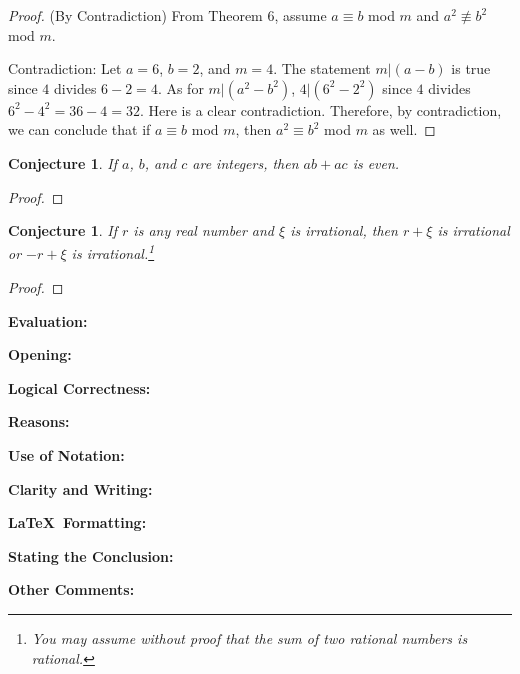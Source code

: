 \documentclass[11pt,titlepage]{article}		%
\def\rubric{\textbf{Evaluation:} \makebox[0.75in]{\hrulefill}

\vspace{.3in}

\textbf{Opening:} \makebox[0.75in]{\hrulefill}

\vspace{.3in}

\textbf{Logical Correctness:} \makebox[0.75in]{\hrulefill}

\vspace{.3in}

\textbf{Reasons:} \makebox[0.75in]{\hrulefill}

\vspace{.3in}

\textbf{Use of Notation:} \makebox[0.75in]{\hrulefill}

\vspace{.3in}

\textbf{Clarity and Writing:} \makebox[0.75in]{\hrulefill}

\vspace{.3in}

\textbf{\LaTeX\ Formatting:} \makebox[0.75in]{\hrulefill}

\vspace{.3in}

\textbf{Stating the Conclusion:} \makebox[0.75in]{\hrulefill}

\vspace{.3in}

\textbf{Other Comments:}

\vspace{1in}

}
\theoremstyle{theorem}
\newtheorem{conjecture}[theorem]{Conjecture}
\begin{document}
\begin{proof}
(By Contradiction) From Theorem 6, assume $a \equiv b$ mod $m$ and $a^2 \not \equiv b^2$ mod $m$.

Contradiction: Let $a=6$, $b=2$, and $m=4$. The statement $m|(a-b)$ is true since $4$ divides $6-2=4$. As for $m|(a^2-b^2)$, $4|(6^2-2^2)$ since $4$ divides $6^2-4^2=36-4=32$. Here is a clear contradiction. Therefore, by contradiction, we can conclude that if $a \equiv b$ mod $m$, then $a^2 \equiv b^2$ mod $m$ as well.
\end{proof}

\clearpage
 

\begin{conjecture}
    If $a$, $b$, and $c$ are integers, then $ab+ac$ is even.
\end{conjecture}

\begin{proof}

\end{proof}

\clearpage

\begin{conjecture}
    If $r$ is any real number and $\xi$ is irrational, then $r + \xi$ is irrational or $-r + \xi$ is irrational.\footnote{You may assume without proof that the sum of two rational numbers is rational.}
\end{conjecture}

\begin{proof}

\end{proof}


\rubric
\end{document}
